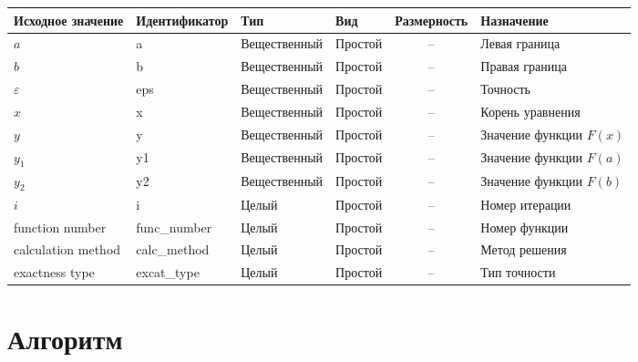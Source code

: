 \documentclass[a4paper]{article}
\begin{document}
{
\fontsize{10pt}{12pt}
\selectfont
\parindent=0mm
\begin{longtable}{|p{1.5cm}|l|l|l|c|p{4cm}|}
\hline
Исходное значение & Идентификатор & Тип & Вид & Размерность & Назначение\\
\hline
$a$ & a & Вещественный & Простой & -- & Левая граница\\
\hline
$b$ & b & Вещественный & Простой & -- & Правая граница\\
\hline
$\varepsilon$ & eps & Вещественный & Простой & -- & Точность\\
\hline
$x$ & x & Вещественный & Простой & -- & Корень уравнения\\
\hline
$y$ & y & Вещественный & Простой & -- & Значение функции $F(x)$\\
\hline
$y_1$ & y1 & Вещественный & Простой & -- & Значение функции $F(a)$\\
\hline
$y_2$ & y2 & Вещественный & Простой & -- & Значение функции $F(b)$\\
\hline
$i$ & i & Целый & Простой & -- & Номер итерации\\
\hline
function number & func\_number & Целый & Простой & -- & Номер функции\\
\hline
calculation method & calc\_method & Целый & Простой & -- & Метод решения\\
\hline
exactness type & excat\_type & Целый & Простой & -- & Тип точности\\
\hline
\end{longtable}
}

\section{Алгоритм}
\end{document}
